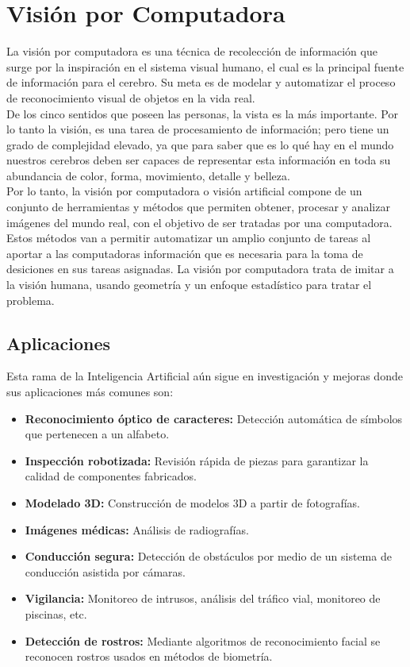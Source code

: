 \section{Visión por Computadora}
La visión por computadora es una técnica de recolección de información que surge por la inspiración en el sistema visual humano, el cual es la principal fuente de información para el cerebro. Su meta es de modelar y automatizar el proceso de reconocimiento visual de objetos en la vida real.\\

De los cinco sentidos que poseen las personas, la vista es la más importante. Por lo tanto la visión, es una tarea de procesamiento de información; pero tiene un grado de complejidad elevado, ya que para saber que es lo qué hay en el mundo nuestros cerebros deben ser capaces de representar esta información en toda su abundancia de color, forma, movimiento, detalle y belleza. \cite{iaarbook:artificialvision}\\

Por lo tanto, la visión por computadora o visión artificial compone de un conjunto de herramientas y métodos que permiten obtener, procesar y analizar imágenes del mundo real, con el objetivo de ser tratadas por una computadora. Estos métodos van a permitir automatizar un amplio conjunto de tareas al aportar a las computadoras información que es necesaria para la toma de desiciones en sus tareas asignadas. La visión por computadora trata de imitar a la visión humana, usando geometría y un enfoque estadístico para tratar el problema.\\

\subsection{Aplicaciones}
Esta rama de la Inteligencia Artificial aún sigue en investigación y mejoras donde sus aplicaciones más comunes son:

\begin{itemize}
    \item \textbf{Reconocimiento óptico de caracteres:} Detección automática de símbolos que pertenecen a un alfabeto.
    \item \textbf{Inspección robotizada:} Revisión rápida de piezas para garantizar la calidad de componentes fabricados.
    \item \textbf{Modelado 3D:} Construcción de modelos 3D a partir de fotografías.
    \item \textbf{Imágenes médicas:} Análisis de radiografías.
    \item \textbf{Conducción segura:} Detección de obstáculos por medio de un sistema de conducción asistida por cámaras.
    \item \textbf{Vigilancia:} Monitoreo de intrusos, análisis del tráfico vial, monitoreo de piscinas, etc.
    \item \textbf{Detección de rostros:} Mediante algoritmos de reconocimiento facial se reconocen rostros usados en métodos de biometría.
\end{itemize}

